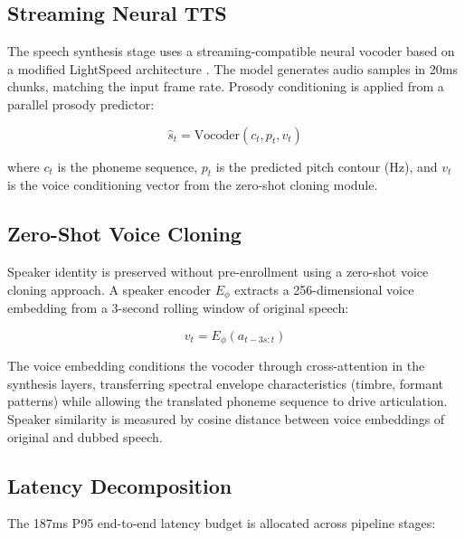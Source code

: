 \documentclass[11pt,a4paper]{article}
\begin{document}
\subsection{Streaming Neural TTS}

The speech synthesis stage uses a streaming-compatible neural vocoder based on a modified LightSpeed architecture \cite{lightspeed}. The model generates audio samples in 20ms chunks, matching the input frame rate. Prosody conditioning is applied from a parallel prosody predictor:

\begin{equation}
  \hat{s}_t = \text{Vocoder}\left(c_t, p_t, v_t\right)
\end{equation}

where $c_t$ is the phoneme sequence, $p_t$ is the predicted pitch contour (Hz), and $v_t$ is the voice conditioning vector from the zero-shot cloning module.

\subsection{Zero-Shot Voice Cloning}

Speaker identity is preserved without pre-enrollment using a zero-shot voice cloning approach. A speaker encoder $E_\phi$ extracts a 256-dimensional voice embedding from a 3-second rolling window of original speech:

\begin{equation}
  v_t = E_\phi\left(a_{t-3s:t}\right)
\end{equation}

The voice embedding conditions the vocoder through cross-attention in the synthesis layers, transferring spectral envelope characteristics (timbre, formant patterns) while allowing the translated phoneme sequence to drive articulation. Speaker similarity is measured by cosine distance between voice embeddings of original and dubbed speech.

\subsection{Latency Decomposition}

The 187ms P95 end-to-end latency budget is allocated across pipeline stages:
\end{document}
